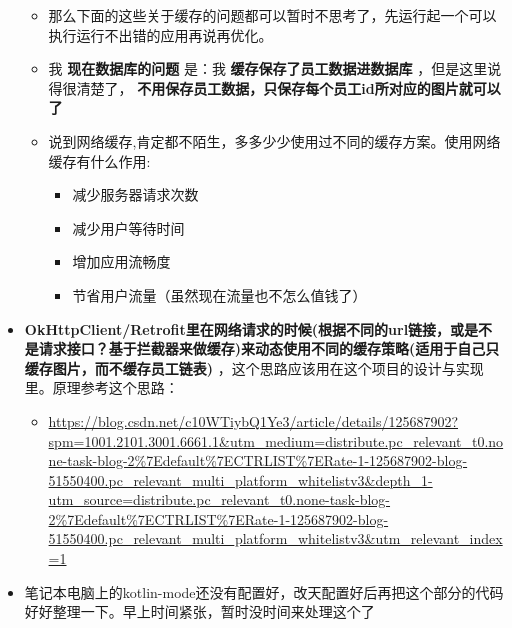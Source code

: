 \documentclass[9pt, b5paper]{article}
\begin{document}
\begin{itemize}
\begin{itemize}
\item 那么下面的这些关于缓存的问题都可以暂时不思考了，先运行起一个可以执行运行不出错的应用再说再优化。
\item 我 \textbf{现在数据库的问题} 是：我 \textbf{缓存保存了员工数据进数据库} ，但是这里说得很清楚了， \textbf{不用保存员工数据，只保存每个员工id所对应的图片就可以了}
\item 说到网络缓存,肯定都不陌生，多多少少使用过不同的缓存方案。使用网络缓存有什么作用:
\begin{itemize}
\item 减少服务器请求次数
\item 减少用户等待时间
\item 增加应用流畅度
\item 节省用户流量（虽然现在流量也不怎么值钱了）
\end{itemize}
\end{itemize}
\item \textbf{OkHttpClient/Retrofit里在网络请求的时候(根据不同的url链接，或是不是请求接口？基于拦截器来做缓存)来动态使用不同的缓存策略(适用于自己只缓存图片，而不缓存员工链表)} ，这个思路应该用在这个项目的设计与实现里。原理参考这个思路： 
\begin{itemize}
\item \url{https://blog.csdn.net/c10WTiybQ1Ye3/article/details/125687902?spm=1001.2101.3001.6661.1&utm_medium=distribute.pc_relevant_t0.none-task-blog-2\%7Edefault\%7ECTRLIST\%7ERate-1-125687902-blog-51550400.pc_relevant_multi_platform_whitelistv3&depth_1-utm_source=distribute.pc_relevant_t0.none-task-blog-2\%7Edefault\%7ECTRLIST\%7ERate-1-125687902-blog-51550400.pc_relevant_multi_platform_whitelistv3&utm_relevant_index=1}
\end{itemize}
\item 笔记本电脑上的kotlin-mode还没有配置好，改天配置好后再把这个部分的代码好好整理一下。早上时间紧张，暂时没时间来处理这个了
\end{itemize}
\end{document}
